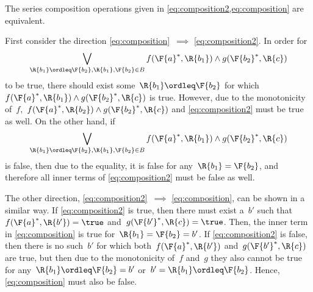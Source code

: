 \begin{remark}
  \label{lemma:composition_equivalency}
  The series composition operations given in \cref{eq:composition2,eq:composition} are equivalent.


  First consider the direction \cref{eq:composition}~$\implies$ \cref{eq:composition2}. In order for
  \begin{equation}
    \bigvee_{\R{b_1}\ordleq\F{b_2}, \R{b_1},\F{b_2}\in B} f(\F{a}^*,\R{b_1}) \wedge g(\F{b_2}^*,\R{c})
  \end{equation}
  to be true, there should exist some~$\R{b_1}\ordleq \F{b_2}$ for which~$f(\F{a}^*,\R{b_1}) \wedge g(\F{b_2}^*,\R{c})$ is true. However, due to the monotonicity of~$f$,~$f(\F{a}^*,\R{b_2}) \wedge g(\F{b_2}^*,\R{c})$ and \cref{eq:composition2} must be true as well. On the other hand, if
  \begin{equation}
    \bigvee_{\R{b_1}\ordleq\F{b_2}, \R{b_1},\F{b_2}\in B} f(\F{a}^*,\R{b_1}) \wedge g(\F{b_2}^*,\R{c})
  \end{equation}
  is false, then due to the equality, it is false for any~$\R{b_1}=\F{b_2}$, and therefore all inner terms of \cref{eq:composition2} must be false as well.

  The other direction, \cref{eq:composition2}~$\implies$ \cref{eq:composition}, can be shown in a similar way. If \cref{eq:composition2} is true, then there must exist a~$b'$ such that~$f(\F{a}^*, \R{b'})=\true$ and~$g(\F{b'}^*, \R{c})=\true$. Then, the inner term in \cref{eq:composition} is true for~$\R{b_1}=\F{b_2}=b'$. If \cref{eq:composition2} is false, then there is no such~$b'$ for which both~$f(\F{a}^*, \R{b'})$ and~$g(\F{b'}^*, \R{c})$ are true, but then due to the monotonicity of~$f$ and~$g$ they also cannot be true for any~$\R{b_1} \ordleq \F{b_2} = b'$ or~$b'=\R{b_1} \ordleq \F{b_2}$. Hence, \cref{eq:composition} must also be false.
\end{remark}
